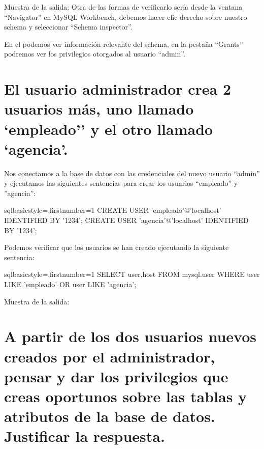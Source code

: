 	\newp Muestra de la salida:
\newpage
	\newp Otra de las formas de verificarlo sería desde la ventana “Navigator” en MySQL Workbench, debemos hacer clic derecho sobre nuestro schema y seleccionar “Schema inspector”.
	
	\newp En el podemos ver información relevante del schema, en la pestaña “Grants” podremos ver los privilegios otorgados al usuario “admin”.
	
\newpage
\section{El usuario administrador crea 2 usuarios más, uno llamado ‘empleado’’ y el otro llamado ‘agencia’.}
	Nos conectamos a la base de datos con las credenciales del nuevo usuario “admin” y ejecutamos las siguientes sentencias para crear los usuarios “empleado” y ”agencia”:
	\begin{sourcecodep}[]{sql}{basicstyle={\fontsize{10}{10}\selectfont\ttfamily},firstnumber=1}{}
		CREATE USER 'empleado'@'localhost' IDENTIFIED BY '1234';
		CREATE USER 'agencia'@'localhost' IDENTIFIED BY '1234';\end{sourcecodep}
	\newp Podemos verificar que los usuarios se han creado ejecutando la siguiente sentencia:
	\begin{sourcecodep}[]{sql}{basicstyle={\fontsize{10}{10}\selectfont\ttfamily},firstnumber=1}{}
		SELECT user,host FROM mysql.user WHERE user LIKE 'empleado' OR user LIKE 'agencia';\end{sourcecodep}
	
	\newp Muestra de la salida:
\newpage
\section{A partir de los dos usuarios nuevos creados por el administrador, pensar y dar los privilegios que creas oportunos sobre las tablas y atributos de la base de datos. Justificar la respuesta.}
